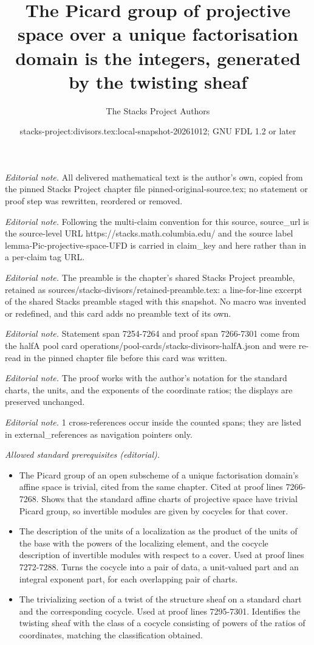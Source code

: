 \documentclass[10pt,a4paper]{amsart}
\title{The Picard group of projective space over a unique factorisation domain is the integers, generated by the twisting sheaf}
\author{The Stacks Project Authors}
\date{stacks-project:divisors.tex:local-snapshot-20261012; GNU FDL 1.2 or later}
\theoremstyle{plain}
\theoremstyle{definition}
\theoremstyle{remark}
\numberwithin{equation}{subsection}
\begin{document}
\maketitle
\noindent\textit{Editorial note.} All delivered mathematical text is the author's own, copied from the pinned Stacks Project chapter file pinned-original-source.tex; no statement or proof step was rewritten, reordered or removed.\par\medskip
\noindent\textit{Editorial note.} Following the multi-claim convention for this source, source\_url is the source-level URL https://stacks.math.columbia.edu/ and the source label lemma-Pic-projective-space-UFD is carried in claim\_key and here rather than in a per-claim tag URL.\par\medskip
\noindent\textit{Editorial note.} The preamble is the chapter's shared Stacks Project preamble, retained as sources/stacks-divisors/retained-preamble.tex: a line-for-line excerpt of the shared Stacks preamble staged with this snapshot. No macro was invented or redefined, and this card adds no preamble text of its own.\par\medskip
\noindent\textit{Editorial note.} Statement span 7254-7264 and proof span 7266-7301 come from the halfA pool card operations/pool-cards/stacks-divisors-halfA.json and were re-read in the pinned chapter file before this card was written.\par\medskip
\noindent\textit{Editorial note.} The proof works with the author's notation for the standard charts, the units, and the exponents of the coordinate ratios; the displays are preserved unchanged.\par\medskip
\noindent\textit{Editorial note.} 1 cross-references occur inside the counted spans; they are listed in external\_references as navigation pointers only.\par\medskip
\noindent\textit{Allowed standard prerequisites (editorial).}\begin{itemize}
\item The Picard group of an open subscheme of a unique factorisation domain's affine space is trivial, cited from the same chapter. Cited at proof lines 7266-7268. Shows that the standard affine charts of projective space have trivial Picard group, so invertible modules are given by cocycles for that cover.
\item The description of the units of a localization as the product of the units of the base with the powers of the localizing element, and the cocycle description of invertible modules with respect to a cover. Used at proof lines 7272-7288. Turns the cocycle into a pair of data, a unit-valued part and an integral exponent part, for each overlapping pair of charts.
\item The trivializing section of a twist of the structure sheaf on a standard chart and the corresponding cocycle. Used at proof lines 7295-7301. Identifies the twisting sheaf with the class of a cocycle consisting of powers of the ratios of coordinates, matching the classification obtained.
\end{itemize}\medskip
\end{document}
